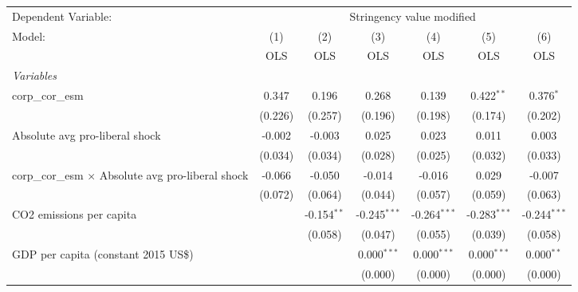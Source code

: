 
\begingroup
\centering
\begin{tabular}{lcccccc}
   \toprule
   Dependent Variable: & \multicolumn{6}{c}{Stringency value modified}\\
   Model:                                                    & (1)     & (2)           & (3)            & (4)            & (5)            & (6)\\  
                                                             &  OLS    & OLS           & OLS            & OLS            & OLS            & OLS\\  
   \midrule
   \emph{Variables}\\
   corp\_cor\_esm                                            & 0.347   & 0.196         & 0.268          & 0.139          & 0.422$^{**}$   & 0.376$^{*}$\\   
                                                             & (0.226) & (0.257)       & (0.196)        & (0.198)        & (0.174)        & (0.202)\\   
   Absolute avg pro-liberal shock                            & -0.002  & -0.003        & 0.025          & 0.023          & 0.011          & 0.003\\   
                                                             & (0.034) & (0.034)       & (0.028)        & (0.025)        & (0.032)        & (0.033)\\   
   corp\_cor\_esm $\times$ Absolute avg pro-liberal shock    & -0.066  & -0.050        & -0.014         & -0.016         & 0.029          & -0.007\\   
                                                             & (0.072) & (0.064)       & (0.044)        & (0.057)        & (0.059)        & (0.063)\\   
   CO2 emissions per capita                                  &         & -0.154$^{**}$ & -0.245$^{***}$ & -0.264$^{***}$ & -0.283$^{***}$ & -0.244$^{***}$\\   
                                                             &         & (0.058)       & (0.047)        & (0.055)        & (0.039)        & (0.058)\\   
   GDP per capita (constant 2015 US\$)                       &         &               & 0.000$^{***}$  & 0.000$^{***}$  & 0.000$^{***}$  & 0.000$^{**}$\\   
                                                             &         &               & (0.000)        & (0.000)        & (0.000)        & (0.000)\\   

\end{tabular}
